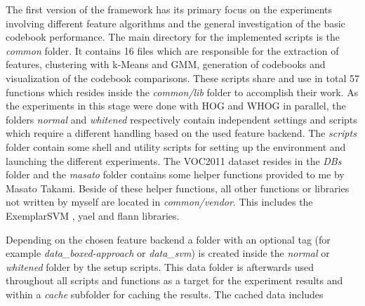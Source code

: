 The first version of the framework has its primary focus on the experiments involving different feature algorithms and the general investigation of the basic codebook performance. The main directory for the implemented \MATLAB scripts is the \textit{common} folder. It contains 16 files which are responsible for the extraction of features, clustering with k-Means and \ac{GMM}, generation of codebooks and visualization of the codebook comparisons. These scripts share and use in total 57 functions which resides inside the \textit{common/lib} folder to accomplish their work. As the experiments in this stage were done with \ac{HOG} and \ac{WHOG} in parallel, the folders \textit{normal} and \textit{whitened} respectively contain independent settings and scripts which require a different handling based on the used feature backend. The \textit{scripts} folder contain some shell and utility scripts for setting up the environment and launching the different experiments. The \ac{VOC2011} dataset resides in the \textit{DBs} folder and the \textit{masato} folder contains some helper functions provided to me by Masato Takami. Beside of these helper functions, all other functions or libraries not written by myself are located in \textit{common/vendor}. This includes the ExemplarSVM \cite{Malisiewicz2011}, yael \cite{yael} and flann \cite{muja_flann_2009} libraries.

Depending on the chosen feature backend a folder with an optional tag (for example \textit{data\_boxed-approach} or \textit{data\_svm}) is created inside the \textit{normal} or \textit{whitened} folder by the setup scripts. This data folder is afterwards used throughout all scripts and functions as a target for the experiment results and within a \textit{cache} subfolder for caching the results. The cached data includes


